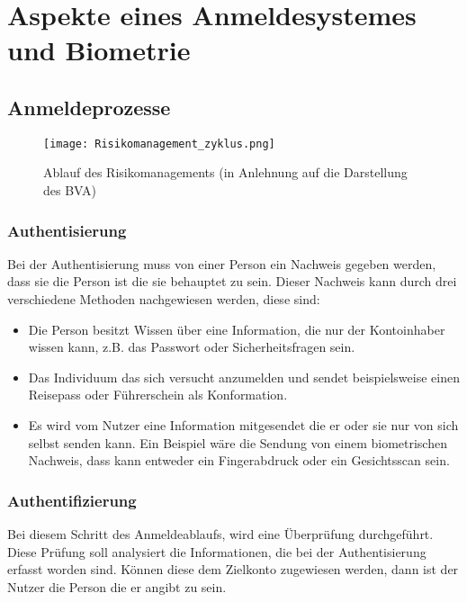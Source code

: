 \chapter{Aspekte eines Anmeldesystemes und Biometrie}
\strahlhofer

\section{Anmeldeprozesse}
\begin{center}
\begin{figure}[h]
    \centering
    \texttt{[image: Risikomanagement\_zyklus.png]}
    \caption{Ablauf des Risikomanagements (in Anlehnung auf die Darstellung des BVA)}
\end{figure}
\end{center}

\subsection{Authentisierung}
Bei der Authentisierung muss von einer Person ein Nachweis gegeben werden, dass sie die Person ist die sie behauptet zu sein. Dieser Nachweis kann durch drei verschiedene Methoden nachgewiesen werden, diese sind:
\begin{itemize}
	\item Die Person besitzt Wissen über eine Information, die nur der Kontoinhaber wissen kann, z.B. das Passwort oder Sicherheitsfragen sein.
	\item Das Individuum das sich versucht anzumelden und sendet beispielsweise einen Reisepass oder Führerschein als Konformation.
	\item Es wird vom Nutzer eine Information mitgesendet die er oder sie nur von sich selbst senden kann. Ein Beispiel wäre die Sendung von einem biometrischen Nachweis, dass kann entweder ein Fingerabdruck oder ein Gesichtsscan sein.
\end{itemize}

\subsection{Authentifizierung}
Bei diesem Schritt des Anmeldeablaufs, wird eine Überprüfung durchgeführt. Diese Prüfung soll analysiert die Informationen, die bei der Authentisierung erfasst worden sind. Können diese dem Zielkonto zugewiesen werden, dann ist der Nutzer die Person die er angibt zu sein.

